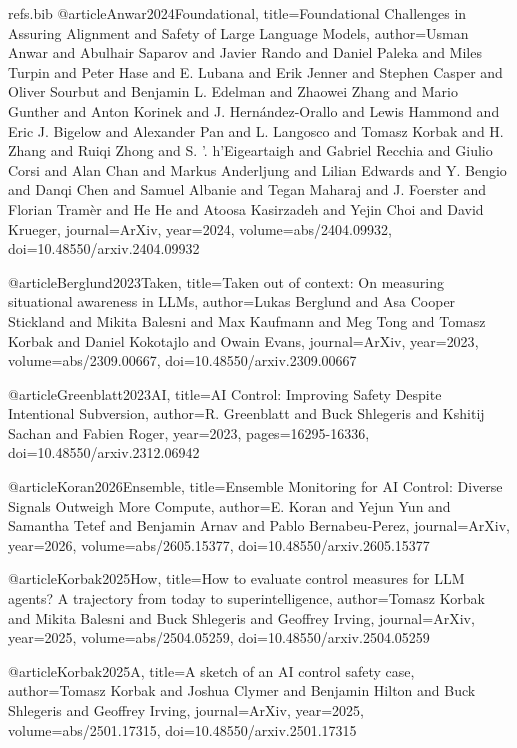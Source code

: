 \begin{filecontents}{refs.bib}
@article{Anwar2024Foundational,
title={Foundational Challenges in Assuring Alignment and Safety of Large Language Models},
author={Usman Anwar and Abulhair Saparov and Javier Rando and Daniel Paleka and Miles Turpin and Peter Hase and E. Lubana and Erik Jenner and Stephen Casper and Oliver Sourbut and Benjamin L. Edelman and Zhaowei Zhang and Mario Gunther and Anton Korinek and J. Hernández-Orallo and Lewis Hammond and Eric J. Bigelow and Alexander Pan and L. Langosco and Tomasz Korbak and H. Zhang and Ruiqi Zhong and S. '. h'Eigeartaigh and Gabriel Recchia and Giulio Corsi and Alan Chan and Markus Anderljung and Lilian Edwards and Y. Bengio and Danqi Chen and Samuel Albanie and Tegan Maharaj and J. Foerster and Florian Tramèr and He He and Atoosa Kasirzadeh and Yejin Choi and David Krueger},
journal={ArXiv},
year={2024},
volume={abs/2404.09932},
doi={10.48550/arxiv.2404.09932}
}

@article{Berglund2023Taken,
title={Taken out of context: On measuring situational awareness in LLMs},
author={Lukas Berglund and Asa Cooper Stickland and Mikita Balesni and Max Kaufmann and Meg Tong and Tomasz Korbak and Daniel Kokotajlo and Owain Evans},
journal={ArXiv},
year={2023},
volume={abs/2309.00667},
doi={10.48550/arxiv.2309.00667}
}

@article{Greenblatt2023AI,
title={AI Control: Improving Safety Despite Intentional Subversion},
author={R. Greenblatt and Buck Shlegeris and Kshitij Sachan and Fabien Roger},
year={2023},
pages={16295-16336},
doi={10.48550/arxiv.2312.06942}
}

@article{Koran2026Ensemble,
title={Ensemble Monitoring for AI Control: Diverse Signals Outweigh More Compute},
author={E. Koran and Yejun Yun and Samantha Tetef and Benjamin Arnav and Pablo Bernabeu-Perez},
journal={ArXiv},
year={2026},
volume={abs/2605.15377},
doi={10.48550/arxiv.2605.15377}
}

@article{Korbak2025How,
title={How to evaluate control measures for LLM agents? A trajectory from today to superintelligence},
author={Tomasz Korbak and Mikita Balesni and Buck Shlegeris and Geoffrey Irving},
journal={ArXiv},
year={2025},
volume={abs/2504.05259},
doi={10.48550/arxiv.2504.05259}
}

@article{Korbak2025A,
title={A sketch of an AI control safety case},
author={Tomasz Korbak and Joshua Clymer and Benjamin Hilton and Buck Shlegeris and Geoffrey Irving},
journal={ArXiv},
year={2025},
volume={abs/2501.17315},
doi={10.48550/arxiv.2501.17315}
}


\end{filecontents}
